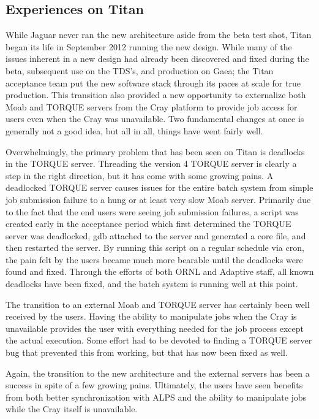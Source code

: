 \subsection{Experiences on Titan}

While Jaguar never ran the new architecture aside from the beta test shot,
Titan began its life in September 2012 running the new design.  While many of
the issues inherent in a new design had already been discovered and fixed
during the beta, subsequent use on the TDS’s, and production on Gaea; the Titan
acceptance team put the new software stack through its paces at scale for true
production.  This transition also provided a new opportunity to externalize
both Moab and TORQUE servers from the Cray platform to provide job access for
users even when the Cray was unavailable.  Two fundamental changes at once is
generally not a good idea, but all in all, things have went fairly well.

Overwhelmingly, the primary problem that has been seen on Titan is deadlocks in
the TORQUE server.  Threading the version 4 TORQUE server is clearly a step in
the right direction, but it has come with some growing pains.  A deadlocked
TORQUE server causes issues for the entire batch system from simple job
submission failure to a hung or at least very slow Moab server.  Primarily due
to the fact that the end users were seeing job submission failures, a script
was created early in the acceptance period which first determined the TORQUE
server was deadlocked, gdb attached to the server and generated a core file,
and then restarted the server.  By running this script on a regular schedule
via cron, the pain felt by the users became much more bearable until the
deadlocks were found and fixed.  Through the efforts of both ORNL and Adaptive
staff, all known deadlocks have been fixed, and the batch system is running
well at this point. 

The transition to an external Moab and TORQUE server has certainly been well
received by the users.  Having the ability to manipulate jobs when the Cray is
unavailable provides the user with everything needed for the job process except
the actual execution.  Some effort had to be devoted to finding a TORQUE server
bug that prevented this from working, but that has now been fixed as well.

Again, the transition to the new architecture and the external servers has been
a success in spite of a few growing pains.  Ultimately, the users have seen
benefits from both better synchronization with ALPS and the ability to
manipulate jobs while the Cray itself is unavailable.

